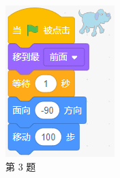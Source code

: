 \documentclass[10pt, a4paper]{article}
\begin{document}
\begin{enumerate}
\begin{figure}[htbp]
\begin{minipage}[t]{.4\textwidth}
\begin{minipage}[t]{.3\textwidth}
                \end{minipage}
                \begin{minipage}[t]{.3\textwidth}
                    \centering
                    \includegraphics[width=\textwidth]{figure/3-3.png}
                \end{minipage}
                \caption*{第 3 题}
            \end{minipage}

\end{figure}
\end{enumerate}
\end{document}
